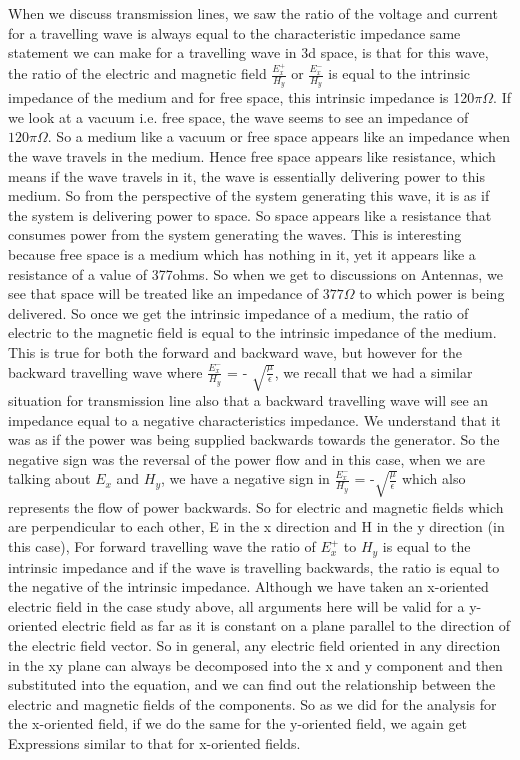 When we discuss transmission lines, we saw the ratio of the voltage and current for a travelling wave is always equal to the characteristic impedance same statement we can make for a travelling wave in 3d space, is that for this wave, the ratio of the electric and magnetic field $\frac{E_x^{+}}{H_y}$ or $\frac{E_x^{-}}{H_y}$ is equal to the intrinsic impedance of the medium and for free space, this intrinsic impedance is 120$\pi\Omega$. If we look at a vacuum i.e. free space, the wave seems to see an impedance of $120\pi\Omega$. So a medium like a vacuum or free space appears like an impedance when the wave travels in the medium. Hence free space appears like resistance, which means if the wave travels in it, the wave is essentially delivering power to this medium. So from the perspective of the system generating this wave, it is as if the system is delivering power to space. So space appears like a resistance that consumes power from the system generating the waves. This is interesting because free space is a medium which has nothing in it, yet it appears like a resistance of a value of 377ohms. So when we get to discussions on Antennas, we see that space will be treated like an impedance of $377\Omega$ to which power is being delivered. So once we get the intrinsic impedance of a medium, the ratio of electric to the magnetic field is equal to the intrinsic impedance of the medium. This is true for both the forward and backward wave, but however for the backward travelling wave where $\frac{E_x^-}{H_y}$ = - $\sqrt{\frac{\mu}{\epsilon}}$, we recall that we had a similar situation for transmission line also that a backward travelling wave will see an impedance equal to a negative characteristics impedance. We understand that it was as if the power was being supplied backwards towards the generator. So the negative sign was the reversal of the power flow and in this case, when we are talking about $E_x$ and $H_y$, we have a negative sign in $\frac{E_x^-}{H_y}$ = -$\sqrt{\frac{\mu}{\epsilon}}$ which also represents the flow of power backwards. So for electric and magnetic fields which are perpendicular to each other, E in the x direction and H in the y direction (in this case), For forward travelling wave the ratio of $E_x^+$ to $H_y$ is equal to the intrinsic impedance and if the wave is travelling backwards, the ratio is equal to the negative of the intrinsic impedance.
Although we have taken an x-oriented electric field in the case study above, all arguments here will be valid for a y-oriented electric field as far as it is constant on a plane parallel to the direction of the electric field vector. So in general, any electric field oriented in any direction in the xy plane can always be decomposed into the x and y component and then substituted into the equation, and we can find out the relationship between the electric and magnetic fields of the components. So as we did for the analysis for the x-oriented field, if we do the same for the y-oriented field, we again get Expressions similar to that for x-oriented fields.

